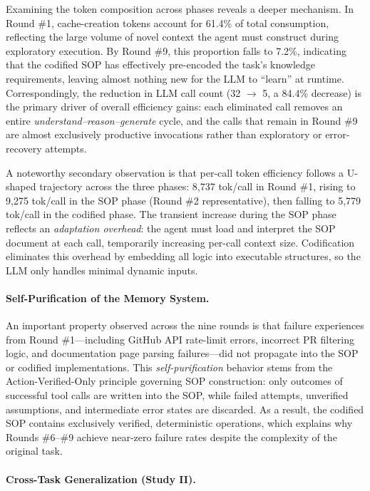 Examining the token composition across phases reveals a deeper mechanism. In Round \#1, cache-creation tokens account for 61.4\% of total consumption, reflecting the large volume of novel context the agent must construct during exploratory execution. By Round \#9, this proportion falls to 7.2\%, indicating that the codified SOP has effectively pre-encoded the task's knowledge requirements, leaving almost nothing new for the LLM to ``learn'' at runtime. Correspondingly, the reduction in LLM call count (32 $\rightarrow$ 5, a 84.4\% decrease) is the primary driver of overall efficiency gains: each eliminated call removes an entire \emph{understand--reason--generate} cycle, and the calls that remain in Round \#9 are almost exclusively productive invocations rather than exploratory or error-recovery attempts.

A noteworthy secondary observation is that per-call token efficiency follows a U-shaped trajectory across the three phases: 8,737 tok/call in Round \#1, rising to 9,275 tok/call in the SOP phase (Round \#2 representative), then falling to 5,779 tok/call in the codified phase. The transient increase during the SOP phase reflects an \emph{adaptation overhead}: the agent must load and interpret the SOP document at each call, temporarily increasing per-call context size. Codification eliminates this overhead by embedding all logic into executable structures, so the LLM only handles minimal dynamic inputs.

\paragraph{Self-Purification of the Memory System.}

An important property observed across the nine rounds is that failure experiences from Round \#1—including GitHub API rate-limit errors, incorrect PR filtering logic, and documentation page parsing failures—did not propagate into the SOP or codified implementations. This \emph{self-purification} behavior stems from the Action-Verified-Only principle governing SOP construction: only outcomes of successful tool calls are written into the SOP, while failed attempts, unverified assumptions, and intermediate error states are discarded. As a result, the codified SOP contains exclusively verified, deterministic operations, which explains why Rounds \#6--\#9 achieve near-zero failure rates despite the complexity of the original task.

\paragraph{Cross-Task Generalization (Study II).}

